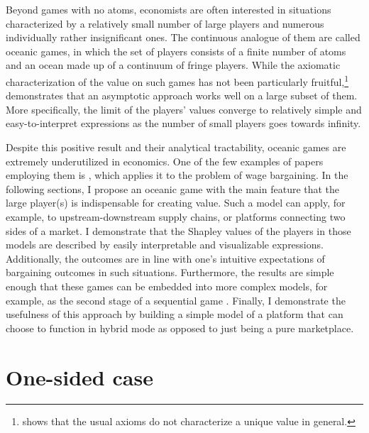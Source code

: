 \documentclass[a4paper]{article}
\begin{document}
Beyond games with no atoms, economists are often interested in situations characterized by a relatively small number of large players and numerous individually rather insignificant ones.
The continuous analogue of them are called oceanic games, in which the set of players consists of a finite number of atoms and an ocean made up of a continuum of fringe players.
While the axiomatic characterization of the value on such games has not been particularly fruitful,\footnote{
    \textcite{hart1973values} shows that the usual axioms do not characterize a unique value in general.
} \textcite{fogelman1980asymptotic} demonstrates that an asymptotic approach works well on a large subset of them.
More specifically, the limit of the players' values converge to relatively simple and easy-to-interpret expressions as the number of small players goes towards infinity.

Despite this positive result and their analytical tractability, oceanic games are extremely underutilized in economics.
One of the few examples of papers employing them is \textcite{levy1997individual}, which applies it to the problem of wage bargaining.
In the following sections, I propose an oceanic game with the main feature that the large player(s) is indispensable for creating value.
Such a model can apply, for example, to upstream-downstream supply chains, or platforms connecting two sides of a market.
I demonstrate that the Shapley values of the players in those models are described by easily interpretable and visualizable expressions.
Additionally, the outcomes are in line with one's intuitive expectations of bargaining outcomes in such situations.
Furthermore, the results are simple enough that these games can be embedded into more complex models, for example, as the second stage of a sequential game \parencite[as in e.g.][]{montez2007downstream}.
Finally, I demonstrate the usefulness of this approach by building a simple model of a platform that can choose to function in hybrid mode as opposed to just being a pure marketplace.


\section{One-sided case}
\end{document}
